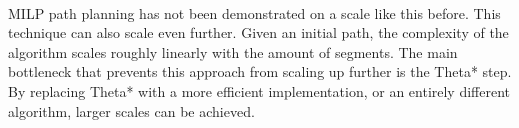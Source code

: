 \\
MILP path planning has not been demonstrated on a scale like this before. This technique can also scale even further. Given an initial path, the complexity of the algorithm scales roughly linearly with the amount of segments. The main bottleneck that prevents this approach from scaling up further is the Theta* step. By replacing Theta* with a more efficient implementation, or an entirely different algorithm, larger scales can be achieved.
